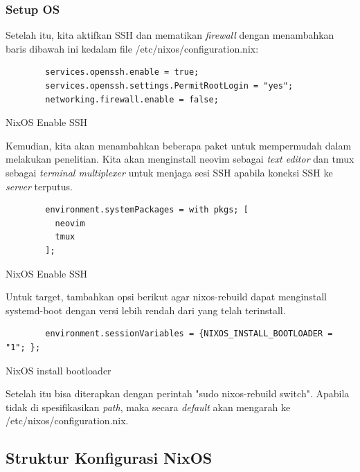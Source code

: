 \documentclass[10pt,twoside]{report}
\newenvironment{code}{\captionsetup{type=listing}}{\vspace{3mm}}
\begin{document}
\begin{adjustwidth}{20pt}{}
	\subsubsection{Setup OS}
	\begin{adjustwidth}{20pt}{}
		Setelah itu, kita aktifkan SSH dan mematikan \textit{firewall} dengan
		menambahkan baris dibawah ini kedalam file /etc/nixos/configuration.nix:
		\begin{code}
			\begin{verbatim}
        services.openssh.enable = true;
        services.openssh.settings.PermitRootLogin = "yes";
        networking.firewall.enable = false;
      \end{verbatim}
			\caption{NixOS Enable SSH}
		\end{code}

		Kemudian, kita akan menambahkan beberapa paket untuk mempermudah dalam
		melakukan penelitian. Kita akan menginstall neovim sebagai \textit{text editor}
		dan tmux sebagai \textit{terminal multiplexer} untuk menjaga sesi SSH apabila koneksi
		SSH ke \textit{server} terputus.

		\begin{code}
			\begin{verbatim}
        environment.systemPackages = with pkgs; [
          neovim
          tmux
        ];
      \end{verbatim}
			\caption{NixOS Enable SSH}
		\end{code}

		Untuk target, tambahkan opsi berikut agar nixos-rebuild dapat menginstall
		systemd-boot dengan versi lebih rendah dari yang telah terinstall.
		\begin{code}
			\begin{verbatim}
        environment.sessionVariables = {NIXOS_INSTALL_BOOTLOADER = "1"; };
      \end{verbatim}
			\caption{NixOS install bootloader}
		\end{code}
		Setelah itu bisa diterapkan dengan perintah "sudo nixos-rebuild switch".
		Apabila tidak di spesifikasikan \textit{path}, maka secara \textit{default}
		akan mengarah ke /etc/nixos/configuration.nix.
	\end{adjustwidth}

	\subsection{Struktur Konfigurasi NixOS}
	\begin{adjustwidth}{20pt}{}


\end{adjustwidth}
\end{adjustwidth}
\end{document}
